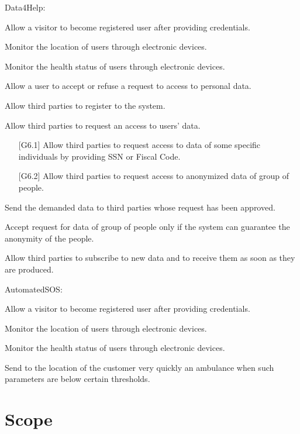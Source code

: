 Data4Help:  
\begin{enumerate} [label={[G\arabic*]}]
    \item Allow a visitor to become registered user after providing credentials.
    \item Monitor the location of users through electronic devices.
    \item Monitor the health status of users through electronic devices.
    \item Allow a user to accept or refuse a request to access to personal data.
    \item Allow third parties to register to the system.
    \item Allow third parties to request an access to users' data.
    \begin{enumerate} [label*={.\arabic*}]
        \item [{[G6.1]}] Allow third parties to request access to data of some specific individuals by providing SSN or Fiscal Code.
        \item [{[G6.2]}] Allow third parties to request access to anonymized data of group of people.
    \end{enumerate}
    \item Send the demanded data to third parties whose request has been approved.
    \item Accept request for data of group of people only if the system can guarantee the anonymity of the people.
    \item Allow third parties to subscribe to new data and to receive them as soon as they are produced.
\end{enumerate}  
\noindent
AutomatedSOS:
\begin{enumerate} [resume, label={[G\arabic*]}]
    \item Allow a visitor to become registered user after providing credentials.
    \item Monitor the location of users through electronic devices.
    \item Monitor the health status of users through electronic devices.
    \item Send to the location of the customer very quickly an ambulance when such parameters are below certain thresholds. 
\end{enumerate}

\section{Scope}
